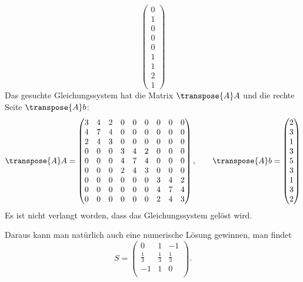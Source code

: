 \begin{loesung}
\[\begin{pmatrix}
0\\1\\0\\
0\\0\\1\\
1\\2\\1
\end{pmatrix}
\]
Das gesuchte Gleichungssystem hat die Matrix $\transpose{A}A$ und die rechte
Seite $\transpose{A}b$:
\[
\transpose{A}A
=
\begin{pmatrix}
3&4&2&0&0&0&0&0&0\\
4&7&4&0&0&0&0&0&0\\
2&4&3&0&0&0&0&0&0\\
%
0&0&0&3&4&2&0&0&0\\
0&0&0&4&7&4&0&0&0\\
0&0&0&2&4&3&0&0&0\\
%
0&0&0&0&0&0&3&4&2\\
0&0&0&0&0&0&4&7&4\\
0&0&0&0&0&0&2&4&3\\
\end{pmatrix}
,\qquad
\transpose{A}b=\begin{pmatrix}2\\3\\1\\3\\5\\3\\1\\3\\2\end{pmatrix}
\]
Es ist nicht verlangt worden, dass das Gleichungssystem gelöst wird.

\end{loesung}

\begin{diskussion}
Daraus kann man natürlich auch eine numerische Lösung gewinnen,
man findet
\[
S=\begin{pmatrix}
0& 1& -1\\
\frac{1}{3} & \frac{1}{3} & \frac{1}{3}\\
-1& 1& 0\\
\end{pmatrix}.
\]
\end{diskussion}

